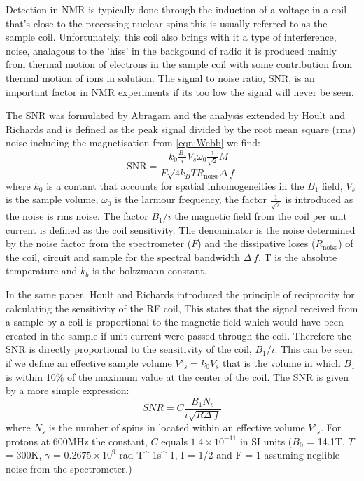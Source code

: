 Detection in NMR is typically done through the induction of a voltage in a coil that's close
to the precessing nuclear spins this is usually referred to as the sample coil. Unfortunately,
this coil also brings with it a type of interference, noise, analagous to the 'hiss' in the backgound
of radio it is produced mainly from thermal motion of electrons in the sample coil with some contribution from thermal
motion of ions in solution. The signal to noise ratio, SNR, is an important factor in NMR experiments if its too low
the signal will never be seen.

The SNR was formulated by Abragam\citep{Abragam:1961vg} and the analysis extended by Hoult and
Richards\citep{Hoult:1976dw} and is defined as the peak signal divided by the root mean square (rms) noise including the magnetisation from \ref{eqn:Webb} we find\citep{vanBentum:2007fda}:
\begin{equation}
  \text{SNR} = \frac{k_0\frac{B_1}{i}V_s\omega_0\frac{1}{\sqrt{2}}M}{F\sqrt{4k_BTR_{\text{noise}}\Delta~f}}
\end{equation}
where $k_0$ is a contant that accounts for spatial inhomogeneities in the $B_1$ field, $V_s$ is the sample volume,
$\omega_0$ is the larmour frequency, the factor $\frac{1}{\sqrt{2}}$ is introduced as the noise is rms noise. The
factor $B_1/i$ the magnetic field from the coil per unit current is defined as the coil sensitivity. The denominator is
the noise determined by the noise factor from the spectrometer ($F$) and the dissipative loses ($R_{\text{noise}}$) of
the coil, circuit and sample for the spectral bandwidth $\Delta~f$. T is the absolute temperature and $k_b$ is the
boltzmann constant.

In the same paper, Hoult and Richards introduced the principle of reciprocity for calculating the
sensitivity of the RF coil, This states that the signal received from a sample by a coil is proportional to the magnetic
field which would have been created in the sample if unit current were passed through the coil. Therefore the SNR is
directly proportional to the sensitivity of the coil, $B_1/i$. This can be seen if we define an
effective sample volume $V'_s = k_0V_s$ that is the volume in which $B_1$ is within 10\% of the maximum
value at the center of the coil. The SNR is given by a more simple expression\citep{vanBentum:2007fda}:
\begin{equation}
  SNR = C\frac{B_1N_s}{i\sqrt{R\Delta~f}}
\end{equation}
where $N_s$ is the number of spins in located within an effective volume $V'_s$.
For protons at 600MHz the constant, $C$ equals $1.4\times10^{-11}$ in SI units ($B_0$ = 14.1T, $T$ = 300K, $\gamma$ =
$0.2675\times10^9$ rad T^{-1}s^{-1}, I = 1/2 and F = 1 assuming neglible noise from the spectrometer.)

